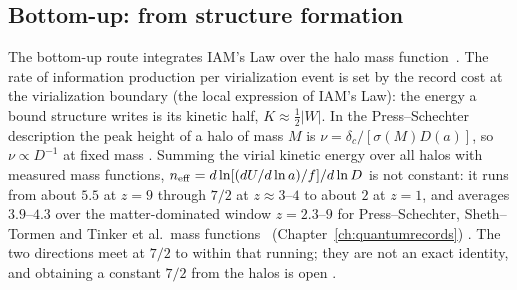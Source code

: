 \subsection{Bottom-up: from structure formation}
The bottom-up route integrates IAM's Law over the halo mass function~\cite{PressSchechter1974}. The rate of information production per virialization event
is set by the record cost at the virialization boundary (the local expression of IAM's Law): the energy a bound structure writes is its kinetic half,
$K\approx\tfrac12|W|$. In the Press--Schechter description the peak height of a halo of mass $M$ is $\nu=\delta_c/[\sigma(M)D(a)]$, so $\nu\propto D^{-1}$ at fixed
mass \derived. Summing the virial kinetic energy over all halos with measured mass functions, $n_{\rm eff}=d\ln[(dU/d\ln a)/f]/d\ln D$ is not constant: it
runs from about $5.5$ at $z=9$ through $7/2$ at $z\approx3$--$4$ to about $2$ at $z=1$, and averages $3.9$--$4.3$ over the matter-dominated window
$z=2.3$--$9$ for Press--Schechter, Sheth--Tormen and Tinker et al.\ mass functions~\cite{PressSchechter1974,ShethTormen1999,Tinker2008}
(Chapter~\ref{ch:quantumrecords}) \calc. The two directions meet at $7/2$ to within that running; they are not an exact identity, and obtaining a constant $7/2$ from the halos is open \openprob.

